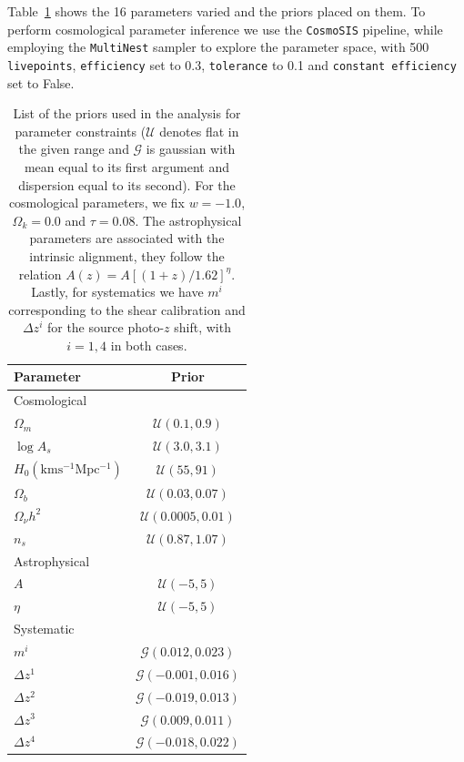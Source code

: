 \documentclass[twocolumn]{\docclass}
\begin{document}
	Table~\ref{tab:constraints} shows the 16 parameters varied and the priors placed on them. To perform cosmological parameter inference we use the {\tt CosmoSIS} \citep{Zuntz:2015med, Lewis2000taj, Kirk2012mnras, Kilbinger2009aa, Howlett2012jcap, Bridle2007njp, Takahashi2012taj, Smith2003mnras} pipeline, while employing the {\tt MultiNest} \citep{Feroz:2009fhb} sampler to explore the parameter space, with 500 {\tt livepoints}, {\tt efficiency} set to 0.3, {\tt tolerance} to 0.1 and {\tt constant efficiency} set to False.
	
	\begin{table}
		\centering
		\begin{tabular} { l c} 
			\hline
			\hline
			Parameter							& Prior	\\ \hline
			Cosmological & \\ [1ex]
			$\Omega_m$						& $\mathcal{U}(0.1, 0.9)$		\\
			$\log A_s$					& $\mathcal{U}(3.0, 3.1)$		\\
			$H_0 \mathrm{(km s^{-1} Mpc^{-1})}$	& $\mathcal{U}(55, 91)$		\\
			$\Omega_b$						& $\mathcal{U}(0.03, 0.07)$	\\
			$\Omega_\nu h^2$					& $\mathcal{U}(0.0005, 0.01)$	\\
			$n_s$							& $\mathcal{U}(0.87, 1.07)$	\\ [1ex]
			\hline
			Astrophysical & \\ [1ex]
			$A$								& $\mathcal{U}(-5, 5)$ \\
			$\eta$							& $\mathcal{U}(-5, 5)$ \\ [1ex]
			\hline
			Systematic & \\ [1ex]
			$m^i$							& $\mathcal{G}(0.012, 0.023)$	 \\
			$\Delta z^1$						& $\mathcal{G}(-0.001, 0.016)$	 \\
			$\Delta z^2$						& $\mathcal{G}(-0.019, 0.013)$	 \\
			$\Delta z^3$						& $\mathcal{G}(0.009, 0.011)$	 \\
			$\Delta z^4$						& $\mathcal{G}(-0.018, 0.022)$	 \\ [1ex]
			\hline
			\hline
		\end{tabular}
		\caption{List of the priors used in the analysis for parameter constraints ($\mathcal{U}$ denotes flat in the given range and $\mathcal{G}$ is gaussian with mean equal to its first argument and dispersion equal to its second). For the cosmological parameters, we fix $w = -1.0$, $\Omega_k =  0.0$ and $\tau =  0.08$. The astrophysical parameters are associated with the intrinsic alignment, they follow the relation $A(z) = A[(1+z)/1.62]^{\eta}$. Lastly, for systematics we have $m^i$ corresponding to the shear calibration and  $\Delta z^i$ for the source photo-$z$ shift, with $i = 1, 4$ in both cases.}
		\label{tab:constraints}
	\end{table}
	
\end{document}
